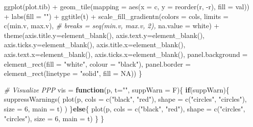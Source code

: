 \documentclass[
]{book}
\newenvironment{Shaded}{\begin{snugshade}}{\end{snugshade}}
\newcommand{\AttributeTok}[1]{\textcolor[rgb]{0.77,0.63,0.00}{#1}}
\newcommand{\CommentTok}[1]{\textcolor[rgb]{0.56,0.35,0.01}{\textit{#1}}}
\newcommand{\ConstantTok}[1]{\textcolor[rgb]{0.00,0.00,0.00}{#1}}
\newcommand{\ControlFlowTok}[1]{\textcolor[rgb]{0.13,0.29,0.53}{\textbf{#1}}}
\newcommand{\DecValTok}[1]{\textcolor[rgb]{0.00,0.00,0.81}{#1}}
\newcommand{\FunctionTok}[1]{\textcolor[rgb]{0.00,0.00,0.00}{#1}}
\newcommand{\NormalTok}[1]{#1}
\newcommand{\OtherTok}[1]{\textcolor[rgb]{0.56,0.35,0.01}{#1}}
\newcommand{\SpecialCharTok}[1]{\textcolor[rgb]{0.00,0.00,0.00}{#1}}
\newcommand{\StringTok}[1]{\textcolor[rgb]{0.31,0.60,0.02}{#1}}
\begin{document}
\begin{Shaded}
\begin{Highlighting}[]
  \FunctionTok{ggplot}\NormalTok{(plot.tib) }\SpecialCharTok{+}
    \FunctionTok{geom\_tile}\NormalTok{(}\AttributeTok{mapping =} \FunctionTok{aes}\NormalTok{(}\AttributeTok{x =}\NormalTok{ c, }\AttributeTok{y =} \FunctionTok{reorder}\NormalTok{(r, }\SpecialCharTok{{-}}\NormalTok{r), }\AttributeTok{fill =}\NormalTok{ val)) }\SpecialCharTok{+}
    \FunctionTok{labs}\NormalTok{(}\AttributeTok{fill =} \StringTok{""}\NormalTok{) }\SpecialCharTok{+}
    \FunctionTok{ggtitle}\NormalTok{(t) }\SpecialCharTok{+}
    \FunctionTok{scale\_fill\_gradientn}\NormalTok{(}\AttributeTok{colors =}\NormalTok{ cols,}
                         \AttributeTok{limits =} \FunctionTok{c}\NormalTok{(min.v, max.v),}
                         \CommentTok{\# breaks = seq(min.v, max.v, 2),}
                         \AttributeTok{na.value =} \StringTok{\textquotesingle{}white\textquotesingle{}}\NormalTok{) }\SpecialCharTok{+}
    \FunctionTok{theme}\NormalTok{(}\AttributeTok{axis.title.y=}\FunctionTok{element\_blank}\NormalTok{(),}
          \AttributeTok{axis.text.y=}\FunctionTok{element\_blank}\NormalTok{(),}
          \AttributeTok{axis.ticks.y=}\FunctionTok{element\_blank}\NormalTok{(),}
          \AttributeTok{axis.title.x=}\FunctionTok{element\_blank}\NormalTok{(),}
          \AttributeTok{axis.text.x=}\FunctionTok{element\_blank}\NormalTok{(),}
          \AttributeTok{axis.ticks.x=}\FunctionTok{element\_blank}\NormalTok{(),}
          \AttributeTok{panel.background =} \FunctionTok{element\_rect}\NormalTok{(}\AttributeTok{fill =} \StringTok{"white"}\NormalTok{,}
                                          \AttributeTok{colour =} \StringTok{"black"}\NormalTok{),}
          \AttributeTok{panel.border =} \FunctionTok{element\_rect}\NormalTok{(}\AttributeTok{linetype =} \StringTok{"solid"}\NormalTok{, }\AttributeTok{fill =} \ConstantTok{NA}\NormalTok{))}
\NormalTok{\}}

\CommentTok{\# Visualize PPP}
\NormalTok{vis }\OtherTok{=} \ControlFlowTok{function}\NormalTok{(p, }\AttributeTok{t=}\StringTok{""}\NormalTok{, }\AttributeTok{suppWarn =}\NormalTok{ F)\{}
  \ControlFlowTok{if}\NormalTok{(suppWarn)\{}
    \FunctionTok{suppressWarnings}\NormalTok{(}
      \FunctionTok{plot}\NormalTok{(p, }\AttributeTok{cols =} \FunctionTok{c}\NormalTok{(}\StringTok{"black"}\NormalTok{, }\StringTok{"red"}\NormalTok{),}
           \AttributeTok{shape =} \FunctionTok{c}\NormalTok{(}\StringTok{"circles"}\NormalTok{, }\StringTok{"circles"}\NormalTok{),}
           \AttributeTok{size =} \DecValTok{6}\NormalTok{,}
           \AttributeTok{main =}\NormalTok{ t)}
\NormalTok{    )}
\NormalTok{  \}}\ControlFlowTok{else}\NormalTok{\{}
    \FunctionTok{plot}\NormalTok{(p, }\AttributeTok{cols =} \FunctionTok{c}\NormalTok{(}\StringTok{"black"}\NormalTok{, }\StringTok{"red"}\NormalTok{),}
         \AttributeTok{shape =} \FunctionTok{c}\NormalTok{(}\StringTok{"circles"}\NormalTok{, }\StringTok{"circles"}\NormalTok{),}
         \AttributeTok{size =} \DecValTok{6}\NormalTok{,}
         \AttributeTok{main =}\NormalTok{ t)}
\NormalTok{  \}}
\NormalTok{\}}
\end{Highlighting}
\end{Shaded}
\end{document}
